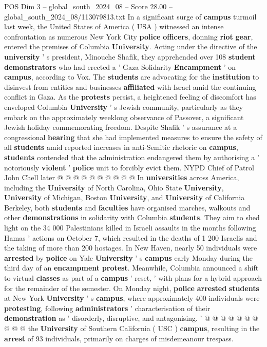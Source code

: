 \begin{textsample}{POS Dim 3 – global\_south\_2024\_08 – Score 28.00 – global\_south\_2024\_08/113079813.txt}  \label{ex:f3_pos_298}
In a significant surge of \textbf{campus} turmoil last week, the United States of America ( USA ) witnessed an intense confrontation as numerous New York City \textbf{police} \textbf{officers}, donning \textbf{riot} \textbf{gear}, entered the premises of Columbia \textbf{University}.
Acting under the directive of the \textbf{university} ' s president, Minouche Shafik, they apprehended over 108 \textbf{student} \textbf{demonstrators} who had erected a ' Gaza Solidarity \textbf{Encampment} ' on \textbf{campus}, according to Vox.
The \textbf{students} are advocating for the \textbf{institution} to disinvest from entities and businesses \textbf{affiliated} with Israel amid the continuing conflict in Gaza.
As the \textbf{protests} persist, a heightened feeling of discomfort has enveloped Columbia \textbf{University} ' s Jewish community, particularly as they embark on the approximately weeklong observance of Passover, a significant Jewish holiday commemorating freedom.
Despite Shafik ' s assurance at a congressional \textbf{hearing} that she had implemented measures to ensure the safety of all \textbf{students} amid reported increases in anti-Semitic rhetoric on \textbf{campus}, \textbf{students} contended that the administration endangered them by authorising a ' notoriously \textbf{violent} ' \textbf{police} unit to forcibly evict them.
NYPD Chief of Patrol John Chell later @ @ @ @ @ @ @ @ @ @ In \textbf{universities} across America, including the \textbf{University} of North Carolina, Ohio State \textbf{University}, \textbf{University} of Michigan, Boston \textbf{University}, and \textbf{University} of California Berkeley, both \textbf{students} and \textbf{faculties} have organised marches, walkouts and other \textbf{demonstrations} in solidarity with Columbia \textbf{students}.
They aim to shed light on the 34 000 Palestinians killed in Israeli assaults in the months following Hamas ' actions on October 7, which resulted in the deaths of 1 200 Israelis and the taking of more than 200 hostages.
In New Haven, nearly 50 individuals were \textbf{arrested} by \textbf{police} on Yale \textbf{University} ' s \textbf{campus} early Monday during the third day of an \textbf{encampment} \textbf{protest}.
Meanwhile, Columbia announced a shift to virtual \textbf{classes} as part of a \textbf{campus} ' reset, ' with plans for a hybrid approach for the remainder of the semester.
On Monday night, \textbf{police} \textbf{arrested} \textbf{students} at New York \textbf{University} ' s \textbf{campus}, where approximately 400 individuals were \textbf{protesting}, following \textbf{administrators} ' characterisation of their \textbf{demonstration} as ' disorderly, disruptive, and antagonising. ' @ @ @ @ @ @ @ @ @ @ the \textbf{University} of Southern California ( USC ) \textbf{campus}, resulting in the \textbf{arrest} of 93 individuals, primarily on charges of misdemeanour trespass.

\end{textsample}

